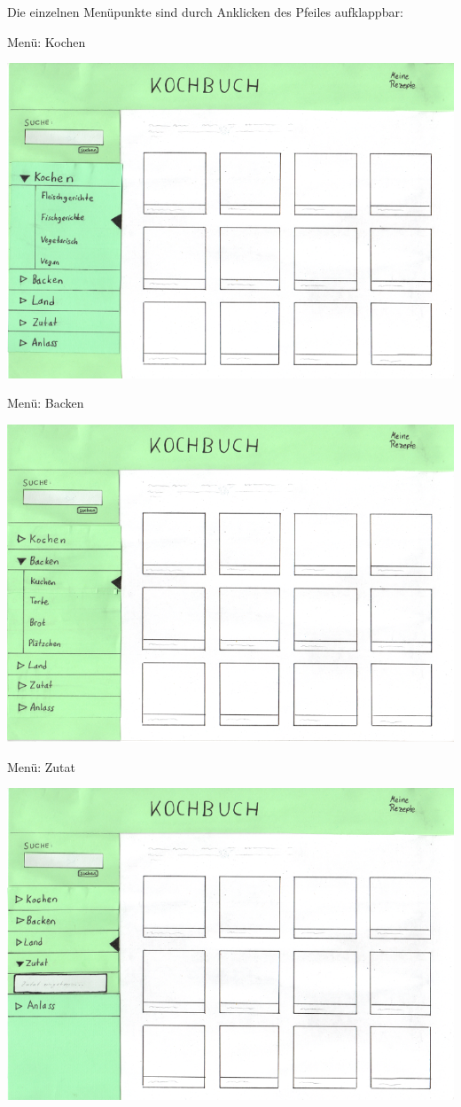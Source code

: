 \documentclass[parskip,10pt,abstracton]{scrartcl}
\begin{document}
Die einzelnen Menüpunkte sind durch Anklicken des Pfeiles aufklappbar:

Menü: Kochen
\begin{center}
\includegraphics[scale=0.4]{Prototyp/menu_kochen.png}
\end{center}

Menü: Backen
\begin{center}
\includegraphics[scale=0.4]{Prototyp/menu_backen.png}
\end{center}
\newpage
Menü: Zutat
\begin{center}
\includegraphics[scale=0.4]{Prototyp/menu_zutat.png}
\end{center}
\end{document}
